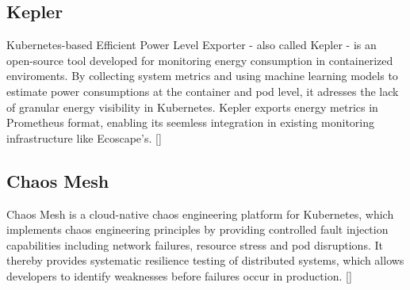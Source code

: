 \subsection{Kepler}
Kubernetes-based Efficient Power Level Exporter - also called Kepler - is an open-source tool developed for monitoring energy consumption in containerized enviroments.
By collecting system metrics and using machine learning models to estimate power consumptions at the container and pod level, it adresses the lack of granular energy visibility in Kubernetes.
Kepler exports energy metrics in Prometheus format, enabling its seemless integration in existing monitoring infrastructure like Ecoscape's. [\cite{kepler2024}]
\subsection{Chaos Mesh}
Chaos Mesh is a cloud-native chaos engineering platform for Kubernetes, which implements chaos engineering principles by providing controlled fault injection capabilities including network failures, resource stress and pod disruptions.
It thereby provides systematic resilience testing of distributed systems, which allows developers to identify weaknesses before failures occur in production. [\cite{chaosmesh2024}]
